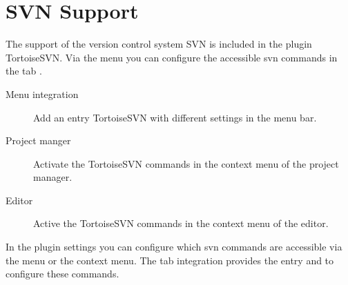 \section{SVN Support}\label{sec:svn}


The support of the version control system SVN is included in the \codeblocks plugin TortoiseSVN. Via the menu  you can configure the accessible svn commands in the tab .

\begin{description}
\item[Menu integration] Add an entry TortoiseSVN with different settings in the menu bar.
\item[Project manger] Activate the TortoiseSVN commands in the context menu of the project manager.
\item[Editor] Active the TortoiseSVN commands in the context menu of the editor.
\end{description}

In the plugin settings you can configure which svn commands are accessible via the menu or the context menu. The tab integration provides the entry  and  to configure these commands.

